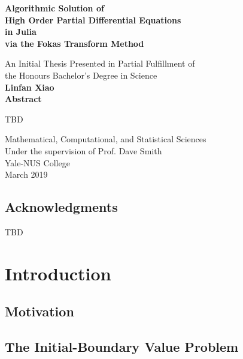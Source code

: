 \documentclass[11pt, oneside, a4paper]{article}
\begin{document}
\begin{titlepage}
\begin{center}
\vspace{1cm}
\huge
\textbf{Algorithmic Solution of\\ High Order Partial Differential Equations\\
in Julia\\ via the Fokas Transform Method}

\LARGE
\vspace{.5cm}
An Initial Thesis Presented in Partial Fulfillment of\\ the Honours Bachelor's Degree in Science\\
\vspace{.5cm}
\textbf{Linfan Xiao}\\
\vspace{.5cm}
\Large
\vspace{.5cm}
\Large
\textbf{Abstract}
\end{center}
TBD

\vfill
\begin{center}	
Mathematical, Computational, and Statistical Sciences\\
Under the supervision of Prof. Dave Smith\\
Yale-NUS College\\
March 2019\\
\end{center}
\end{titlepage}
\tableofcontents
\listoffigures
\listoftables
\pagebreak
{}
\begin{center}\section*{Acknowledgments}\end{center}
TBD

\pagebreak
{}

\section{Introduction}
\subsection{Motivation}
\subsection{The Initial-Boundary Value Problem}
\end{document}
